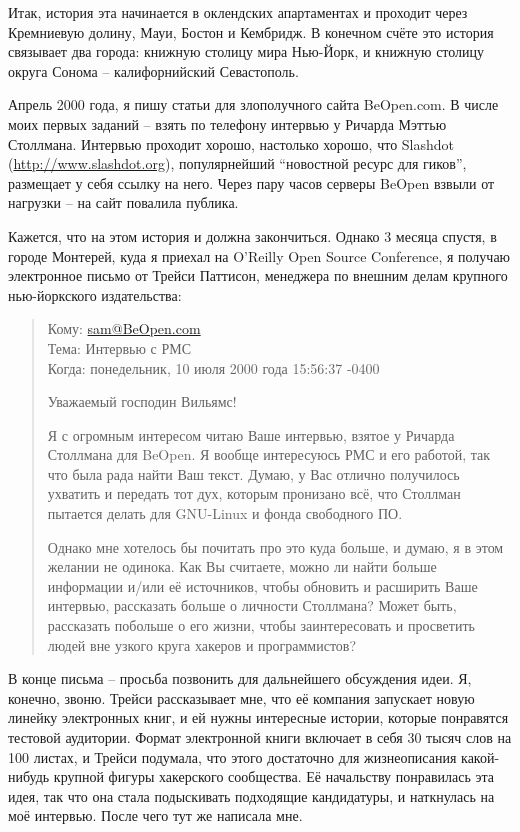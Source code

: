 Итак, история эта начинается в оклендских апартаментах и проходит через Кремниевую долину, Мауи, Бостон и Кембридж. В конечном счёте это история связывает два города: книжную столицу мира Нью-Йорк, и книжную столицу округа Сонома -- калифорнийский Севастополь.

Апрель 2000 года, я пишу статьи для злополучного сайта BeOpen.com. В числе моих первых заданий -- взять по телефону интервью у Ричарда Мэттью Столлмана. Интервью проходит хорошо, настолько хорошо, что Slashdot (\url{http://www.slashdot.org}), популярнейший \enquote{новостной ресурс для гиков}, размещает у себя ссылку на него. Через пару часов серверы BeOpen взвыли от нагрузки -- на сайт повалила публика.

Кажется, что на этом история и должна закончиться. Однако 3 месяца спустя, в городе Монтерей, куда я приехал на O'Reilly Open Source Conference, я получаю электронное письмо от Трейси Паттисон, менеджера по внешним делам крупного нью-йоркского издательства:

\begin{quote}
Кому: \url{sam@BeOpen.com}\\Тема: Интервью с РМС\\Когда: понедельник, 10 июля 2000 года 15:56:37 -0400

Уважаемый господин Вильямс!

Я с огромным интересом читаю Ваше интервью, взятое у Ричарда Столлмана для BeOpen. Я вообще интересуюсь РМС и его работой, так что была рада найти Ваш текст. Думаю, у Вас отлично получилось ухватить и передать тот дух, которым пронизано всё, что Столлман пытается делать для GNU-Linux и фонда свободного ПО.

Однако мне хотелось бы почитать про это куда больше, и думаю, я в этом желании не одинока. Как Вы считаете, можно ли найти больше информации и/или её источников, чтобы обновить и расширить Ваше интервью, рассказать больше о личности Столлмана? Может быть, рассказать побольше о его жизни, чтобы заинтересовать и просветить людей вне узкого круга хакеров и программистов?
\end{quote}

В конце письма -- просьба позвонить для дальнейшего обсуждения идеи. Я, конечно, звоню. Трейси рассказывает мне, что её компания запускает новую линейку электронных книг, и ей нужны интересные истории, которые понравятся тестовой аудитории. Формат электронной книги включает в себя 30 тысяч слов на 100 листах, и Трейси подумала, что этого достаточно для жизнеописания какой-нибудь крупной фигуры хакерского сообщества. Её начальству понравилась эта идея, так что она стала подыскивать подходящие кандидатуры, и наткнулась на моё интервью. После чего тут же написала мне.

